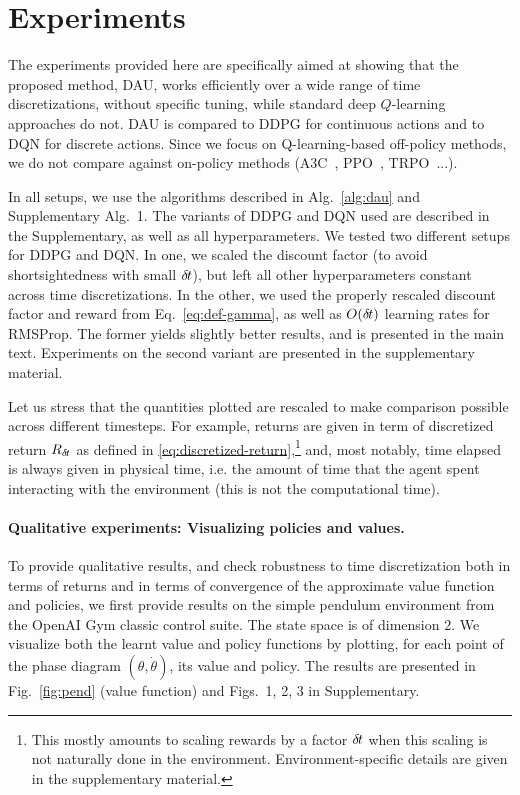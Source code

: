 \section{Experiments}
\label{sec:exp}

The experiments provided here are specifically aimed at showing that
the proposed method, DAU, works efficiently over a wide range of time
discretizations, without specific tuning, while standard deep $Q$-learning
approaches do not. DAU is compared to DDPG for continuous actions and to
DQN for
discrete actions.
Since we focus on Q-learning-based off-policy methods, we do not
compare against on-policy methods (A3C~\cite{a3c}, PPO~\cite{ppo},
TRPO~\cite{trpo}...).

In all setups, we use the algorithms described in
Alg.~\ref{alg:dau} and Supplementary Alg.~1. The variants of DDPG and DQN
used are described in the Supplementary, as well as all hyperparameters. We tested two different setups for DDPG and DQN.
In one, we scaled the discount factor (to avoid shortsightedness with small ${\delta\hspace{-.1em}t}$), but
left all other hyperparameters constant across time discretizations.
In the other, we used the properly rescaled discount
factor and reward from Eq.~\eqref{eq:def-gamma},
as well as $O({\delta\hspace{-.1em}t})$ learning rates for RMSProp.  The former yields slightly
better results, and is presented in the main text. Experiments on the second
variant are presented in the
supplementary material.

Let us stress that the quantities plotted are rescaled to make comparison
possible across different timesteps. For example,
returns are given in term of discretized return $R_{\delta\hspace{-.1em}t}$ as defined in \eqref{eq:discretized-return},\footnote{This mostly amounts to scaling rewards
by a factor ${\delta\hspace{-.1em}t}$ when this scaling is not naturally done in the environment. Environment-specific
details are given in the supplementary material.} and, most notably, time elapsed is always given in
physical time, i.e. the amount of time that the agent spent interacting with the environment (this is not the computational time).


\paragraph{Qualitative experiments: Visualizing policies and values.}
To provide qualitative results, and check robustness to time
discretization both in terms of returns and in terms
of convergence of the approximate value function and policies, we first provide results on the simple pendulum environment
from the OpenAI Gym classic control suite.  The state space is of
dimension $2$. We visualize both the learnt value and policy functions by
plotting, for each point of the phase diagram $(\theta, \dot{\theta})$,
its value and policy. The results are presented in
Fig.~\ref{fig:pend} (value function) and Figs.~1, 2,  3 in
Supplementary.

